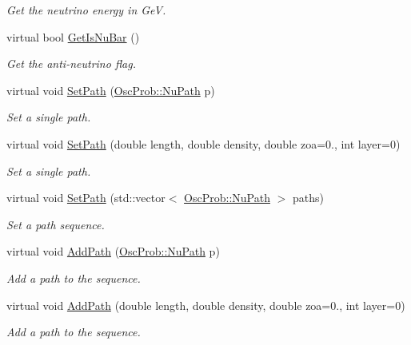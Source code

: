 \begin{DoxyCompactItemize}
\begin{DoxyCompactList}\small\item\em Get the neutrino energy in GeV. \end{DoxyCompactList}\item 
virtual bool \hyperlink{classOscProb_1_1PMNS__Base_a2f7f2a028dfe7a90fff6b4f757972c2c}{Get\+Is\+Nu\+Bar} ()
\begin{DoxyCompactList}\small\item\em Get the anti-\/neutrino flag. \end{DoxyCompactList}\item 
virtual void \hyperlink{classOscProb_1_1PMNS__Base_ac3b644fd0a56347d304ceca4ae9d8875}{Set\+Path} (\hyperlink{structOscProb_1_1NuPath}{Osc\+Prob\+::\+Nu\+Path} p)
\begin{DoxyCompactList}\small\item\em Set a single path. \end{DoxyCompactList}\item 
virtual void \hyperlink{classOscProb_1_1PMNS__Base_a35b983270613072a3df58b574d80dbfd}{Set\+Path} (double length, double density, double zoa=0., int layer=0)
\begin{DoxyCompactList}\small\item\em Set a single path. \end{DoxyCompactList}\item 
virtual void \hyperlink{classOscProb_1_1PMNS__Base_a637d19dd850b4246507796526622643c}{Set\+Path} (std\+::vector$<$ \hyperlink{structOscProb_1_1NuPath}{Osc\+Prob\+::\+Nu\+Path} $>$ paths)
\begin{DoxyCompactList}\small\item\em Set a path sequence. \end{DoxyCompactList}\item 
virtual void \hyperlink{classOscProb_1_1PMNS__Base_a887dc9d4dc569ec0cdef3933b4c60efc}{Add\+Path} (\hyperlink{structOscProb_1_1NuPath}{Osc\+Prob\+::\+Nu\+Path} p)
\begin{DoxyCompactList}\small\item\em Add a path to the sequence. \end{DoxyCompactList}\item 
virtual void \hyperlink{classOscProb_1_1PMNS__Base_ab7f89ad9e7e1224adaa59d3c41594cd9}{Add\+Path} (double length, double density, double zoa=0., int layer=0)
\begin{DoxyCompactList}\small\item\em Add a path to the sequence. \end{DoxyCompactList}\item 

\end{DoxyCompactItemize}
